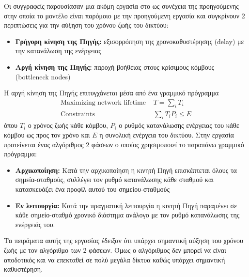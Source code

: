 Οι συγγραφείς παρουσίασαν μια ακόμη εργασία στο \cite{jointmobility_2006} ως συνέχεια της προηγούμενης στην οποία το μοντέλο είναι παρόμοιο με την προηγούμενη
εργασία και συγκρίνουν 2 περιπτώσεις για την αύξηση του χρόνου ζωής του δικτύου:
\begin{itemize}
\item \textbf{Γρήγορη κίνηση της Πηγής:} εξισορρόπηση της χρονοκαθυστέρησης (delay) με την κατανάλωση της ενέργειας
\item \textbf{Αργή κίνηση της Πηγής:} παροχή βοήθειας στους κρίσιμους κόμβους (bottleneck nodes)
\end{itemize}
Η αργή κίνηση της Πηγής επιτυγχάνεται μέσα από ένα γραμμικό πρόγραμμα
\begin{align*}
\text{Maximizing network lifetime } & T=\sum\limits_{i}T_{i}\\
\text{Constraints } & \sum\limits_{i}T_{i}P_{i}\leq E
\end{align*}
όπου $T_{i}$ ο χρόνος ζωής κάθε κόμβου, $P_{i}$ ο ρυθμός κατανάλωσης ενέργειας του κάθε κόμβου ως προς τον χρόνο και $E$ η συνολική ενέργεια του δικτύου.
Στην εργασία προτείνεται ένας αλγόριθμος 2 φάσεων ο οποίος χρησιμοποιεί το παραπάνω γραμμικό πρόγραμμα:
\begin{itemize}
\item \textbf{Αρχικοποίηση:} Κατά την αρχικοποίηση η κινητή Πηγή επισκέπτεται όλους τα σημεία-σταθμούς, συλλέγει τον ρυθμό κατανάλωσης κάθε σταθμού και κατασκευάζει
ένα προφίλ αυτού του σημείου-σταθμούς
\item \textbf{Εν λειτουργία:} Κατά την πραγματική λειτουργία η κινητή Πηγή παραμένει σε κάθε σημείο-σταθμό χρονικό διάστημα ανάλογο με τον ρυθμό κατανάλωσης της
ενέργειάς του.
\end{itemize}
Τα πειράματα αυτής της εργασίας έδειξαν ότι υπάρχει σημαντική αύξηση του χρόνου ζωής με τον αλγόριθμο των 2 φάσεων. Όμως ο αλγόριθμος δεν μπορεί να είναι
αποδοτικός και να επεκταθεί σε πολύ μεγάλα δίκτυα καθώς υπάρχει σημαντική καθυστέρηση.


